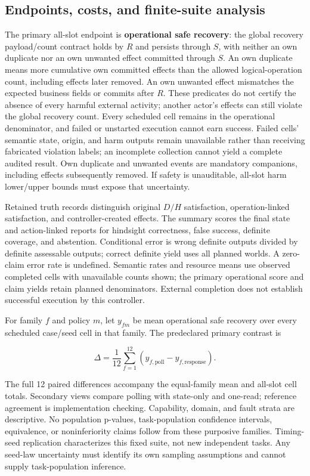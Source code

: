 \documentclass[conference]{IEEEtran}
\begin{document}
\subsection{Endpoints, costs, and finite-suite analysis}

The primary all-slot endpoint is \textbf{operational safe recovery}: the global recovery payload/count contract holds by $R$ and persists through $S$, with neither an own duplicate nor an own unwanted effect committed through $S$. An own duplicate means more cumulative own committed effects than the allowed logical-operation count, including effects later removed. An own unwanted effect mismatches the expected business fields or commits after $R$. These predicates do not certify the absence of every harmful external activity; another actor's effects can still violate the global recovery count. Every scheduled cell remains in the operational denominator, and failed or unstarted execution cannot earn success. Failed cells' semantic state, origin, and harm outputs remain unavailable rather than receiving fabricated violation labels; an incomplete collection cannot yield a complete audited result. Own duplicate and unwanted events are mandatory companions, including effects subsequently removed. If safety is unauditable, all-slot harm lower/upper bounds must expose that uncertainty.

Retained truth records distinguish original $D/H$ satisfaction, operation-linked satisfaction, and controller-created effects. The summary scores the final state and action-linked reports for hindsight correctness, false success, definite coverage, and abstention. Conditional error is wrong definite outputs divided by definite assessable outputs; correct definite yield uses all planned worlds. A zero-claim error rate is undefined. Semantic rates and resource means use observed completed cells with unavailable counts shown; the primary operational score and claim yields retain planned denominators. External completion does not establish successful execution by this controller.

For family $f$ and policy $m$, let $y_{fm}$ be mean operational safe recovery over every scheduled case/seed cell in that family. The predeclared primary contrast is

\begin{equation}
\Delta = \frac{1}{12}\sum_{f=1}^{12}
  (y_{f,\mathrm{poll}}-y_{f,\mathrm{response}}).
\end{equation}

The full 12 paired differences accompany the equal-family mean and all-slot cell totals. Secondary views compare polling with state-only and one-read; reference agreement is implementation checking. Capability, domain, and fault strata are descriptive. No population p-values, task-population confidence intervals, equivalence, or noninferiority claims follow from these purposive families. Timing-seed replication characterizes this fixed suite, not new independent tasks. Any seed-law uncertainty must identify its own sampling assumptions and cannot supply task-population inference.
\end{document}
